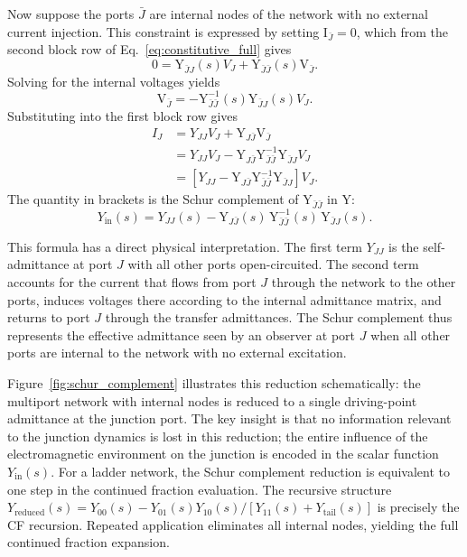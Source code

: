 \documentclass[reprint, floatfix, superscriptaddress, amsmath, amssymb, longbibliography]{revtex4-2}
\begin{document}
Now suppose the ports $\bar{J}$ are internal nodes of the network with no external current injection. This constraint is expressed by setting $\mathrm{I}_{\bar{J}} = \mathrm{0}$, which from the second block row of Eq.~\eqref{eq:constitutive_full} gives
\begin{equation}
\mathrm{0} = \mathrm{Y}_{\bar{J}J}(s) V_J + \mathrm{Y}_{\bar{J}\bar{J}}(s) \mathrm{V}_{\bar{J}}.
\label{eq:internal_constraint}
\end{equation}
Solving for the internal voltages yields
\begin{equation}
\mathrm{V}_{\bar{J}} = -\mathrm{Y}_{\bar{J}\bar{J}}^{-1}(s) \mathrm{Y}_{\bar{J}J}(s) V_J.
\label{eq:internal_voltages}
\end{equation}
Substituting into the first block row gives
\begin{align}
I_J &= Y_{JJ} V_J + \mathrm{Y}_{J\bar{J}} \mathrm{V}_{\bar{J}} \nonumber \\
&= Y_{JJ} V_J - \mathrm{Y}_{J\bar{J}} \mathrm{Y}_{\bar{J}\bar{J}}^{-1} \mathrm{Y}_{\bar{J}J} V_J \nonumber \\
&= \left[ Y_{JJ} - \mathrm{Y}_{J\bar{J}} \mathrm{Y}_{\bar{J}\bar{J}}^{-1} \mathrm{Y}_{\bar{J}J} \right] V_J.
\label{eq:schur_derivation}
\end{align}
The quantity in brackets is the Schur complement of $\mathrm{Y}_{\bar{J}\bar{J}}$ in $\mathrm{Y}$:
\begin{equation}
Y_{\mathrm{in}}(s) = Y_{JJ}(s) - \mathrm{Y}_{J\bar{J}}(s) \, \mathrm{Y}_{\bar{J}\bar{J}}^{-1}(s) \, \mathrm{Y}_{\bar{J}J}(s).
\label{eq:schur_complement}
\end{equation}

This formula has a direct physical interpretation. The first term $Y_{JJ}$ is the self-admittance at port $J$ with all other ports open-circuited. The second term accounts for the current that flows from port $J$ through the network to the other ports, induces voltages there according to the internal admittance matrix, and returns to port $J$ through the transfer admittances. The Schur complement thus represents the effective admittance seen by an observer at port $J$ when all other ports are internal to the network with no external excitation.

Figure~\ref{fig:schur_complement} illustrates this reduction schematically: the multiport network with internal nodes is reduced to a single driving-point admittance at the junction port. The key insight is that no information relevant to the junction dynamics is lost in this reduction; the entire influence of the electromagnetic environment on the junction is encoded in the scalar function $Y_{\mathrm{in}}(s)$. For a ladder network, the Schur complement reduction is equivalent to one step in the continued fraction evaluation. The recursive structure $Y_{\mathrm{reduced}}(s) = Y_{00}(s) - Y_{01}(s)Y_{10}(s)/[Y_{11}(s) + Y_{\mathrm{tail}}(s)]$ is precisely the CF recursion. Repeated application eliminates all internal nodes, yielding the full continued fraction expansion.
\end{document}
